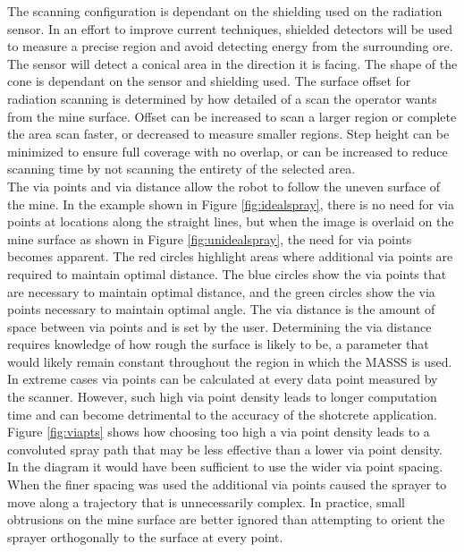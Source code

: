 The scanning configuration is dependant on the shielding used on the radiation sensor. In an effort to improve current techniques, shielded detectors will be used to measure a precise region and avoid detecting energy from the surrounding ore. The sensor will detect a conical area in the direction it is facing. The shape of the cone is dependant on the sensor and shielding used. The surface offset for radiation scanning is determined by how detailed of a scan the operator wants from the mine surface. Offset can be increased to scan a larger region or complete the area scan faster, or decreased to measure smaller regions. Step height can be minimized to ensure full coverage with no overlap, or can be increased to reduce scanning time by not scanning the entirety of the selected area.\\

The via points and via distance allow the robot to follow the uneven surface of the mine. In the example shown in Figure \ref{fig:idealspray}, there is no need for via points at locations along the straight lines, but when the image is overlaid on the mine surface as shown in Figure \ref{fig:unidealspray}, the need for via points becomes apparent. The red circles highlight areas where additional via points are required to maintain optimal distance. The blue circles show the via points that are necessary to maintain optimal distance, and the green circles show the via points necessary to maintain optimal angle. The via distance is the amount of space between via points and is set by the user. Determining the via distance requires knowledge of how rough the surface is likely to be, a parameter that would likely remain constant throughout the region in which the MASSS is used. In extreme cases via points can be calculated at every data point measured by the scanner. However, such high via point density leads to longer computation time and can become detrimental to the accuracy of the shotcrete application. Figure \ref{fig:viapts} shows how choosing too high a via point density leads to a convoluted spray path that may be less effective than a lower via point density. In the diagram it would have been sufficient to use the wider via point spacing. When the finer spacing was used the additional via points caused the sprayer to move along a trajectory that is unnecessarily complex.  In practice, small obtrusions on the mine surface are better ignored than attempting to orient the sprayer orthogonally to the surface at every point.\\

